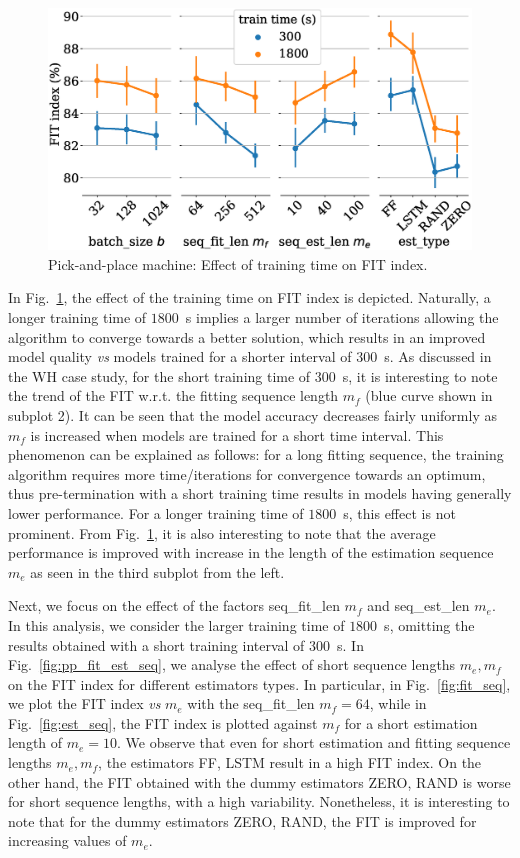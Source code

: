 \documentclass{article}
\newcommand{\seqlen}{m}
\begin{document}
\begin{figure}
	\centering
	\includegraphics[width=.7\columnwidth]{figures/PP_train_time_effect.eps}
	\caption{Pick-and-place machine: Effect of training time on FIT index.}
	\label{fig:PP_train_time}
\end{figure}

In Fig.~\ref{fig:PP_train_time}, the effect of the training time on FIT index is depicted. Naturally, a longer training time of $1800$~s implies a larger number of iterations allowing the algorithm to converge towards a better solution, which results in an improved model quality \emph{vs} models trained for a shorter interval of $300$~s. As discussed in the WH case study, for the short training time of $300$~s, it is interesting to note the trend of the FIT w.r.t. the fitting sequence length $\seqlen_f$  (blue curve shown in subplot 2). It can be seen that the model accuracy decreases fairly uniformly as $\seqlen_f$ is increased when models are trained for a short time interval. This phenomenon can be explained as follows: for a long fitting sequence, the training algorithm requires more time/iterations for convergence towards an optimum, thus pre-termination with a short training time results in models having generally lower performance. For a longer training time of $1800$~s, this effect is not prominent. From Fig.~\ref{fig:PP_train_time}, it is also interesting to note that the average performance is improved with increase in the length of the estimation sequence $\seqlen_e$ as seen in the third subplot from the left. 

Next, we focus on the effect of the factors seq\_fit\_len $\seqlen_f$ and seq\_est\_len $\seqlen_e$. In this analysis, we consider the larger training time of $1800$~s, omitting the results obtained with a short training interval of $300$~s. In Fig.~\ref{fig:pp_fit_est_seq}, we analyse the effect of {short} sequence lengths $\seqlen_e, \seqlen_f$ on the FIT index  for different estimators types. In particular, in Fig.~\ref{fig:fit_seq}, we plot the FIT index \emph{vs} $\seqlen_e$ with the seq\_fit\_len  $\seqlen_f= 64$, while in Fig.~\ref{fig:est_seq}, the FIT index is plotted against $\seqlen_f$ for a short estimation length of $\seqlen_e=10$. 
We observe that even for short estimation and fitting sequence lengths $\seqlen_e, \seqlen_f$, the estimators FF, LSTM result in a high FIT index. On the other hand, the FIT obtained with the dummy estimators ZERO, RAND is worse for short sequence lengths, with a high variability. Nonetheless,  it is interesting to note that for the dummy estimators ZERO, RAND, the FIT is improved for increasing values of $\seqlen_e$. 
\end{document}

